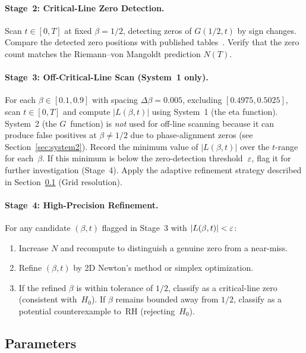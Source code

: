 \paragraph{Stage~2: Critical-Line Zero Detection.}
Scan $t \in [0, T]$ at fixed $\beta = 1/2$, detecting zeros of $G(1/2, t)$ by sign
changes. Compare the detected zero positions with published
tables~\cite{odlyzko1989,lmfdb}. Verify that the zero count matches the Riemann--von
Mangoldt prediction $N(T)$.

\paragraph{Stage~3: Off-Critical-Line Scan (System~1 only).}
For each $\beta \in [0.1, 0.9]$ with spacing $\Delta\beta = 0.005$, excluding
$[0.4975, 0.5025]$, scan $t \in [0, T]$ and compute $|L(\beta, t)|$ using System~1 (the
eta function). System~2 (the $G$~function) is \emph{not} used for off-line scanning
because it can produce false positives at $\beta \neq 1/2$ due to phase-alignment zeros
(see Section~\ref{sec:system2}). Record the minimum value of $|L(\beta, t)|$ over the
$t$-range for each~$\beta$. If this minimum is below the zero-detection threshold~$\varepsilon$,
flag it for further investigation (Stage~4). Apply the adaptive refinement strategy
described in Section~\ref{sec:params} (Grid resolution).

\paragraph{Stage~4: High-Precision Refinement.}
For any candidate $(\beta, t)$ flagged in Stage~3 with $|L(\beta, t)| < \varepsilon$:
\begin{enumerate}
  \item[(a)] Increase $N$ and recompute to distinguish a genuine zero from a near-miss.
  \item[(b)] Refine $(\beta, t)$ by 2D Newton's method or simplex optimization.
  \item[(c)] If the refined $\beta$ is within tolerance of $1/2$, classify as a
             critical-line zero (consistent with~$H_0$). If $\beta$ remains bounded away
             from $1/2$, classify as a potential counterexample to~RH (rejecting~$H_0$).
\end{enumerate}


\subsection{Parameters}
\label{sec:params}

